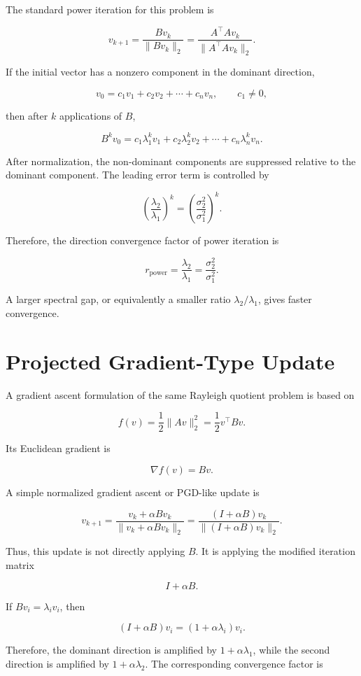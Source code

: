 \documentclass{article}
\begin{document}
The standard power iteration for this problem is

\[
v_{k+1}
=
\frac{Bv_k}{\|Bv_k\|_2}
=
\frac{A^\top A v_k}{\|A^\top A v_k\|_2}.
\]

If the initial vector has a nonzero component in the dominant direction,

\[
v_0
=
c_1 v_1+c_2 v_2+\cdots+c_n v_n,
\qquad c_1\neq 0,
\]

then after \(k\) applications of \(B\),

\[
B^k v_0
=
c_1\lambda_1^k v_1
+
c_2\lambda_2^k v_2
+
\cdots
+
c_n\lambda_n^k v_n.
\]

After normalization, the non-dominant components are suppressed relative to the dominant component. The leading error term is controlled by

\[
\left(\frac{\lambda_2}{\lambda_1}\right)^k
=
\left(\frac{\sigma_2^2}{\sigma_1^2}\right)^k.
\]

Therefore, the direction convergence factor of power iteration is

\[
r_{\mathrm{power}}
=
\frac{\lambda_2}{\lambda_1}
=
\frac{\sigma_2^2}{\sigma_1^2}.
\]

A larger spectral gap, or equivalently a smaller ratio \(\lambda_2/\lambda_1\), gives faster convergence.

\section{Projected Gradient-Type Update}

A gradient ascent formulation of the same Rayleigh quotient problem is based on

\[
f(v)
=
\frac{1}{2}\|Av\|_2^2
=
\frac{1}{2}v^\top Bv.
\]

Its Euclidean gradient is

\[
\nabla f(v)
=
Bv.
\]

A simple normalized gradient ascent or PGD-like update is

\[
v_{k+1}
=
\frac{v_k+\alpha Bv_k}
{\|v_k+\alpha Bv_k\|_2}
=
\frac{(I+\alpha B)v_k}
{\|(I+\alpha B)v_k\|_2}.
\]

Thus, this update is not directly applying \(B\). It is applying the modified iteration matrix

\[
I+\alpha B.
\]

If \(Bv_i=\lambda_i v_i\), then

\[
(I+\alpha B)v_i
=
(1+\alpha\lambda_i)v_i.
\]

Therefore, the dominant direction is amplified by \(1+\alpha\lambda_1\), while the second direction is amplified by \(1+\alpha\lambda_2\). The corresponding convergence factor is
\end{document}
